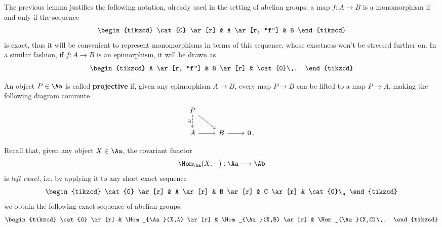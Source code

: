 The previous lemma justifies the following notation,
already used in the setting of abelian groups:
a map $f:A \to B$ is a monomorphism if and only if the sequence
\begin{equation*}
    \begin{tikzcd}
        \cat{0} \ar[r] & A \ar[r, "f"] & B
    \end{tikzcd}
\end{equation*}
is exact, thus it will be convenient to represent monomorphisms
in terms of this sequence, whose exactness won't be stressed further on.
In a similar fashion, if $f:A \to B$ is an epimorphism,
it will be drawn as
\begin{equation*}
    \begin{tikzcd}
        A \ar[r, "f"] & B \ar[r] & \cat{0}\,.
    \end{tikzcd}
\end{equation*}


\begin{df}
    An object $P \in \Aa$ is called \textbf{projective}
    if, given any epimorphism $A \to B$,
    every map $P \to B$ can be lifted to a map $P \to A$,
    making the following diagram commute
    \begin{equation}\label{proj-diag}
        \begin{tikzcd}
            P \ar[d, "\exists"', dashed] \ar[dr] & & \\ 
            A \ar[r] & B \ar[r] & 0 \,.
        \end{tikzcd}
    \end{equation}
\end{df}

Recall that, given any object $X \in \Aa$, the covariant functor
\begin{equation*}
    \Hom_{\Aa}(X,-) : \Aa \longrightarrow \Ab
\end{equation*}
is \emph{left exact}, i.e. by applying it to any
short exact sequence
\begin{equation*}
    \begin{tikzcd}
        \cat{0} \ar[r]
        & A \ar[r]
        & B \ar[r]
        & C \ar[r]
        & \cat{0}\,,
    \end{tikzcd}
\end{equation*}
we obtain the following exact sequence of abelian groups:
\begin{equation*}
    \begin{tikzcd}
        \cat{0} \ar[r]
        & \Hom_{\Aa}(X,A) \ar[r]
        & \Hom_{\Aa}(X,B) \ar[r]
        & \Hom_{\Aa}(X,C)\,.
    \end{tikzcd}
\end{equation*}

